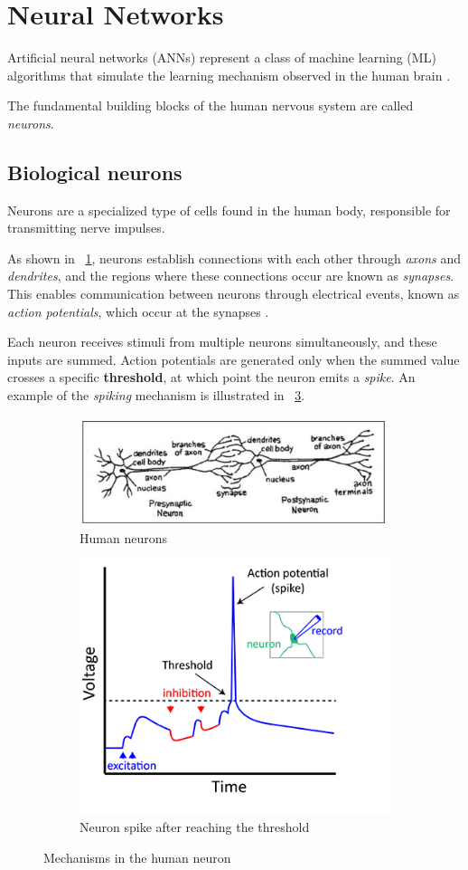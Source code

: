 \section{Neural Networks}
Artificial neural networks (ANNs) represent a class of machine learning (ML) algorithms that simulate the learning mechanism observed in the human brain \cite{aggarwal2018neural}. 

The fundamental building blocks of the human nervous system are called \textit{neurons}. 

\subsection{Biological neurons}

Neurons are a specialized type of cells found in the human body, responsible for transmitting nerve impulses.

As shown in \Fig~\ref{fig:neurons}, neurons establish connections with each other through \textit{axons} and \textit{dendrites}, and the regions where these connections occur are known as \textit{synapses}. This enables communication between neurons through electrical events, known as \textit{action potentials}, which occur at the synapses \cite{APS}. 

Each neuron receives stimuli from multiple neurons simultaneously, and these inputs are summed. Action potentials are generated only when the summed value crosses a specific \textbf{threshold}, at which point the neuron emits a \textit{spike}. An example of the \textit{spiking} mechanism is illustrated in \Fig~\ref{fig:spking}.

\begin{figure}[h]
	\centering
	\begin{subfigure}{.5\textwidth}
		\centering
		\includegraphics[width=0.7\linewidth]{ImageFiles/NeuralNetworks/neuron}
		\caption{Human neurons}
		\label{fig:neurons}
	\end{subfigure}%
	\begin{subfigure}{.5\textwidth}
		\centering
		\includegraphics[width=0.5\linewidth]{ImageFiles/NeuralNetworks/spiking}
		\caption{Neuron spike after reaching the threshold}
		\label{fig:spking}
	\end{subfigure}
	\caption{Mechanisms in the human neuron}
\end{figure}

